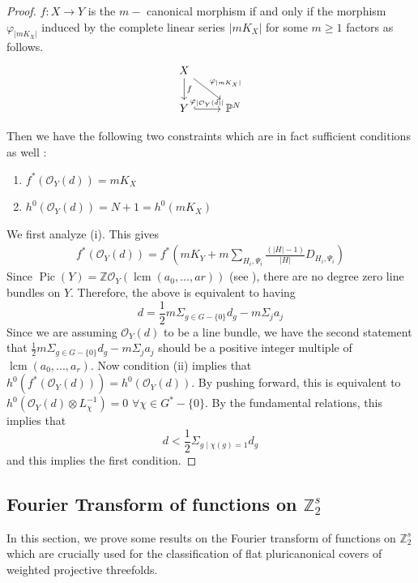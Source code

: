 \documentclass[12pt,twoside,]{amsart}
\theoremstyle{plain}
\theoremstyle{definition}
\begin{document}
\begin{proof}
 $f: X \to Y$ is the $m-$ canonical morphism if and only if the morphism $\varphi_{|mK_X|}$ induced by the complete linear series $|mK_X|$ for some $m \geq 1$ factors as follows.
\[
\begin{tikzcd}
    X \arrow[d, "f"] \arrow[dr, "\varphi_{|mK_X|}"] & \\
    Y \arrow[r, "\varphi_{|\mathcal{O}_{Y}(d)|}", hook] & \mathbb{P}^N
\end{tikzcd}
\]

Then we have the following two constraints which are in fact sufficient conditions as well :
\begin{enumerate}
    \item[(i)] $f^*(\mathcal{O}_{Y}(d)) = mK_X$
    \item[(ii)] $h^0(\mathcal{O}_{Y}(d)) = N+1 = h^0(mK_X)$
\end{enumerate}

We first analyze (i). This gives
\begin{align*}
    f^*(\mathcal{O}_Y(d)) = f^* 
       \left( 
    mK_Y + m\sum_{H_i, \Psi_i} \frac{(|H|-1)}{|H|} D_{H_i, \Psi_i}
       \right)
   \end{align*}
Since $\operatorname{Pic}(Y) = \mathbb{Z}\mathcal{O}_Y(\operatorname{lcm}(a_0,...,ar))$ (see \cite[Theorem $3.2.4$]{dolgachevwps82}), there are no degree zero line bundles on $Y$. Therefore, the above is equivalent to having 
$$d = \displaystyle\frac{1}{2}m \Sigma_{g \in G-\{0\}} d_g - m \Sigma_j a_j$$
Since we are assuming $\mathcal{O}_Y(d)$ to be a line bundle, we have the second statement that $\displaystyle\frac{1}{2}m \Sigma_{g \in G-\{0\}} d_g - m \Sigma_j a_j$ should be a positive integer multiple of $\operatorname{lcm}(a_0,...,a_r)$.
Now condition (ii) implies that $h^0(f^*(\mathcal{O}_Y(d))) = h^0(\mathcal{O}_Y(d))$. By pushing forward, this is equivalent to $h^0(\mathcal{O}_Y(d) \otimes L_{\chi}^{-1}) = 0$ $ \forall \chi \in G^*-\{0\}$. By the fundamental relations, this implies that 
$$d < \displaystyle\frac{1}{2} \Sigma_{g
     \mid \chi(g) = 1} d_g $$
and this implies the first condition.
\end{proof}

\subsection{Fourier Transform of functions on $\mathbb{Z}_2^s$}

In this section, we prove some results on the Fourier transform of functions on $\mathbb{Z}_2^s$ which are crucially used for the classification of flat pluricanonical covers of weighted projective threefolds.
\end{document}
